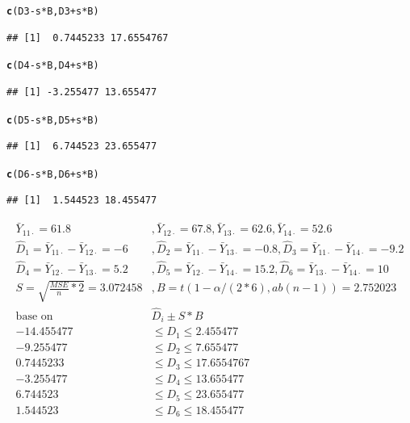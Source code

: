 \documentclass{article}\usepackage[]{graphicx}\usepackage[]{color}
\makeatletter
\newcommand{\hlopt}[1]{\textcolor[rgb]{0,0,0}{#1}}%
\newcommand{\hlstd}[1]{\textcolor[rgb]{0.345,0.345,0.345}{#1}}%
\newcommand{\hlkwd}[1]{\textcolor[rgb]{0.737,0.353,0.396}{\textbf{#1}}}%
\newenvironment{kframe}{%
 \def\at@end@of@kframe{}%
 \ifinner\ifhmode%
  \def\at@end@of@kframe{\end{minipage}}%
  \begin{minipage}{\columnwidth}%
 \fi\fi%
 \def\FrameCommand##1{\hskip\@totalleftmargin \hskip-\fboxsep
 \colorbox{shadecolor}{##1}\hskip-\fboxsep
     \hskip-\linewidth \hskip-\@totalleftmargin \hskip\columnwidth}%
 \MakeFramed {\advance\hsize-\width
   \@totalleftmargin\z@ \linewidth\hsize
   \@setminipage}}%
 {\par\unskip\endMakeFramed%
 \at@end@of@kframe}
\newenvironment{knitrout}{}{} %
\makeatother
\begin{document}
\begin{enumerate}[(a)]
\begin{knitrout}
\begin{kframe}
\begin{alltt}
  \hlkwd{c}\hlstd{(D3}\hlopt{-}\hlstd{s}\hlopt{*}\hlstd{B, D3}\hlopt{+}\hlstd{s}\hlopt{*}\hlstd{B)}
\end{alltt}
\begin{verbatim}
## [1]  0.7445233 17.6554767
\end{verbatim}
\begin{alltt}
  \hlkwd{c}\hlstd{(D4}\hlopt{-}\hlstd{s}\hlopt{*}\hlstd{B, D4}\hlopt{+}\hlstd{s}\hlopt{*}\hlstd{B)}
\end{alltt}
\begin{verbatim}
## [1] -3.255477 13.655477
\end{verbatim}
\begin{alltt}
  \hlkwd{c}\hlstd{(D5}\hlopt{-}\hlstd{s}\hlopt{*}\hlstd{B, D5}\hlopt{+}\hlstd{s}\hlopt{*}\hlstd{B)}
\end{alltt}
\begin{verbatim}
## [1]  6.744523 23.655477
\end{verbatim}
\begin{alltt}
  \hlkwd{c}\hlstd{(D6}\hlopt{-}\hlstd{s}\hlopt{*}\hlstd{B, D6}\hlopt{+}\hlstd{s}\hlopt{*}\hlstd{B)}
\end{alltt}
\begin{verbatim}
## [1]  1.544523 18.455477
\end{verbatim}
\end{kframe}
\end{knitrout}

\begin{displaymath}
\begin{split}
\bar{Y}_{11 \cdot} = 61.8 &, \bar{Y}_{12 \cdot} = 67.8 , \bar{Y}_{13 \cdot} = 62.6, \bar{Y}_{14 \cdot} = 52.6 \\
\hat{D}_1 = \bar{Y}_{11 \cdot}-\bar{Y}_{12 \cdot} = -6 &,  \hat{D}_2 = \bar{Y}_{11 \cdot}-\bar{Y}_{13 \cdot}=-0.8 , \hat{D}_3 = \bar{Y}_{11 \cdot}-\bar{Y}_{14 \cdot}=-9.2 \\
\hat{D}_4 = \bar{Y}_{12 \cdot}-\bar{Y}_{13 \cdot} =5.2 &,  \hat{D}_5 = \bar{Y}_{12 \cdot}-\bar{Y}_{14 \cdot}=15.2 , \hat{D}_6 = \bar{Y}_{13 \cdot}-\bar{Y}_{14 \cdot}=10 \\
S = \sqrt{\frac{MSE}{n}*2} = 3.072458 &, B = t(1-\alpha/(2*6), ab(n-1))=2.752023\\
\text{base on} &\hat{D}_i \pm S*B\\
-14.455477 & \leq D_1 \leq 2.455477  \\
-9.255477 &\leq D_2 \leq 7.655477 \\
0.7445233 &\leq D_3 \leq 17.6554767  \\
-3.255477 & \leq D_4 \leq 13.655477  \\
6.744523 &\leq D_5 \leq 23.655477\\
1.544523 &\leq D_6 \leq 18.455477  \\
\end{split}
\end{displaymath}


\end{enumerate}
\end{document}
